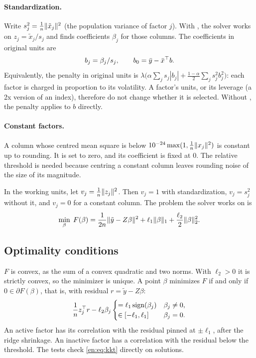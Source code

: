 \paragraph{Standardization.} Write $s_j^2=\frac1n\lVert \tilde x_j\rVert^2$ (the population variance
of factor $j$). With , the solver works on $z_j=\tilde x_j/s_j$ and finds
coefficients $\beta_j$ for those columns. The coefficients in original units are
\[
  b_j=\beta_j/s_j,\qquad b_0=\bar y-\bar x^\top b.
\]
Equivalently, the penalty in original units is
$\lambda\big(\alpha\sum_js_j|b_j|+\tfrac{1-\alpha}2\sum_js_j^2b_j^2\big)$: each factor is
charged in proportion to its volatility. A factor's units, or its leverage (a 2x version of
an index), therefore do not change whether it is selected. Without , the
penalty applies to $b$ directly.

\paragraph{Constant factors.} A column whose centred mean square is below
$10^{-24}\max(1,\frac1n\lVert x_j\rVert^2)$ is constant up to rounding. It is set to zero, and its
coefficient is fixed at $0$. The relative threshold is needed because centring a constant
column leaves rounding noise of the size of its magnitude.

In the working units, let $v_j=\frac1n\lVert z_j\rVert^2$. Then $v_j=1$ with standardization,
$v_j=s_j^2$ without it, and $v_j=0$ for a constant column. The problem the solver works on is
\begin{equation}\label{en:eq:working}
  \min_\beta\;F(\beta)=\frac1{2n}\lVert \tilde y-Z\beta\rVert^2+\ell_1\lVert \beta\rVert_1+\frac{\ell_2}2\lVert \beta\rVert_2^2 .
\end{equation}

\subsection{Optimality conditions}

$F$ is convex, as the sum of a convex quadratic and two norms. With $\ell_2>0$ it is
strictly convex, so the minimizer is unique. A point $\beta$ minimizes $F$ if and only if
$0\in\partial F(\beta)$, that is, with residual $r=\tilde y-Z\beta$:
\begin{equation}\label{en:eq:kkt}
  \frac1n z_j^\top r-\ell_2\beta_j
  \begin{cases}
    =\ell_1\operatorname{sign}(\beta_j) & \beta_j\ne0,\\
    \in[-\ell_1,\ell_1] & \beta_j=0.
  \end{cases}
\end{equation}
An active factor has its correlation with the residual pinned at $\pm\ell_1$, after the
ridge shrinkage. An inactive factor has a correlation with the residual below the
threshold. The tests check \eqref{en:eq:kkt} directly on solutions.


